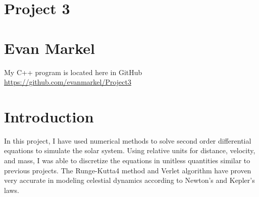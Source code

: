 \documentclass[11pt,a4wide]{article}
\begin{document}
\section*{Project 3}
\section*{Evan Markel}

My C++ program is located here in GitHub \url{https://github.com/evanmarkel/Project3}

\section*{Introduction}
%
In this project, I have used numerical methods to solve second order differential equations to simulate the solar system. Using relative units for distance, velocity, and mass, I was able to discretize the equations in unitless quantities similar to previous projects. The Runge-Kutta4 method and Verlet algorithm have proven very accurate in modeling celestial dynamics according to Newton's and Kepler's laws. 
\end{document}
